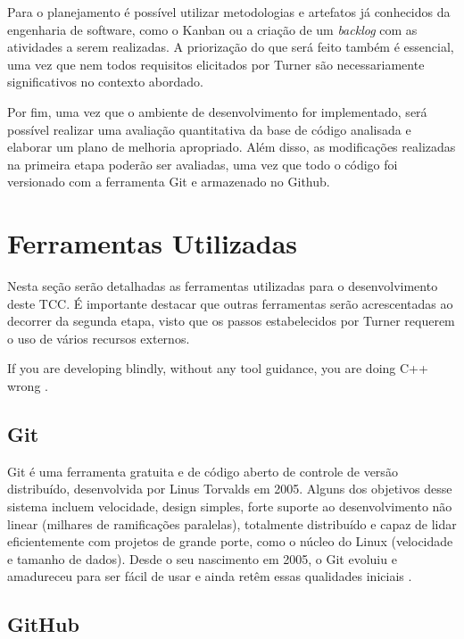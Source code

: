 Para o planejamento é possível utilizar metodologias e artefatos já conhecidos da engenharia de software, 
como o Kanban ou a criação de um \textit{backlog} com as atividades a serem realizadas. A priorização do 
que será feito também é essencial, uma vez que nem todos requisitos elicitados por Turner são necessariamente 
significativos no contexto abordado.

Por fim, uma vez que o ambiente de desenvolvimento for implementado, será possível realizar uma avaliação 
quantitativa da base de código analisada e elaborar um plano de melhoria apropriado. Além disso, as 
modificações realizadas na primeira etapa poderão ser avaliadas, uma vez que todo o código foi versionado 
com a ferramenta Git e armazenado no Github.

\section{Ferramentas Utilizadas}

Nesta seção serão detalhadas as ferramentas utilizadas para o desenvolvimento deste TCC. É importante 
destacar que outras ferramentas serão acrescentadas ao decorrer da segunda etapa, visto que os passos 
estabelecidos por Turner requerem o uso de vários recursos externos.

\begin{citacao}
    If you are developing blindly, without any tool guidance, you are doing C++ wrong \cite{turnerC++Weekly350}.
\end{citacao}

\subsection{Git}

Git é uma ferramenta gratuita e de código aberto de controle de versão distribuído, desenvolvida por 
Linus Torvalds em 2005. Alguns dos objetivos desse sistema incluem velocidade, design simples, forte 
suporte ao desenvolvimento não linear (milhares de ramificações paralelas), totalmente distribuído e 
capaz de lidar eficientemente com projetos de grande porte, como o núcleo do Linux (velocidade e tamanho 
de dados). Desde o seu nascimento em 2005, o Git evoluiu e amadureceu para ser fácil de usar e ainda 
retêm essas qualidades iniciais \cite{chacon2014pro}.

\subsection{GitHub}

